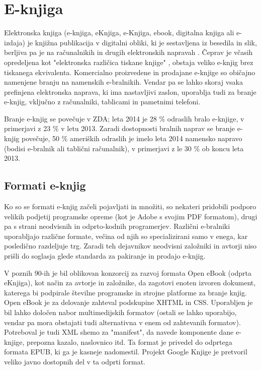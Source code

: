 \documentclass[a4paper, 12pt]{book}
\begin{document}
\section{E-knjiga}
\label{eknjiga}
Elektronska knjiga (e-knjiga, eKnjiga, e-Knjiga, ebook, digitalna knjiga ali e-izdaja) je knjižna publikacija v digitalni obliki, ki je sestavljena iz besedila in slik, berljiva pa je na računalnikih in drugih elektronskih napravah \cite{7}. Čeprav je včasih opredeljena kot "elektronska različica tiskane knjige" \cite{8}, obstaja veliko e-knjig brez tiskanega ekvivalenta. Komercialno proizvedene in prodajane e-knjige so običajno namenjene branju na namenskih e-bralnikih. Vendar pa se lahko skoraj vsaka prefinjena elektronska naprava, ki ima nastavljivi zaslon, uporablja tudi za branje e-knjig, vključno z računalniki, tablicami in pametnimi telefoni.

Branje e-knjig se povečuje v ZDA; leta 2014 je 28 \% odraslih bralo e-knjige, v primerjavi z 23 \% v letu 2013. Zaradi dostopnosti bralnih naprav se branje e-knjig povečuje, 50 \% ameriških odraslih je imelo leta 2014 namensko napravo (bodisi e-bralnik ali tablični računalnik), v primerjavi z le 30 \% ob koncu leta 2013. \cite{9} 

\subsection{Formati e-knjig}
\label{eknjiga_formati}
Ko so se formati e-knjig začeli pojavljati in množiti, so nekateri pridobili podporo velikih podjetij programske opreme (kot je Adobe s svojim PDF formatom), drugi pa s strani neodvisnih in odprto-kodnih programerjev. Različni e-bralniki uporabljajo različne formate, večina od njih so specializirani samo v enega, kar posledično razdeljuje trg. Zaradi teh dejavnikov neodvisni založniki in avtorji niso prišli do soglasja glede standarda za pakiranje in prodajo e-knjig.

V poznih 90-ih je bil oblikovan konzorcij za razvoj formata Open eBook (odprta eKnjiga), kot način za avtorje in založnike, da zagotovi enoten izvoren dokument, katerega bi podpirale številne  programske in strojne platforme za branje knjig. Open eBook je za delovanje zahteval podskupine XHTML in CSS. Uporabljen je bil lahko določen nabor multimedijskih formatov (ostali se lahko uporabijo, vendar pa mora obstajati tudi alternativna v enem od zahtevanih formatov). Potreboval je tudi XML shemo za "manifest", da navede komponente dane e-knjige, prepozna kazalo, naslovnico itd. Ta format je privedel do odprtega formata EPUB, ki ga je kasneje nadomestil. Projekt Google Knjige je pretvoril veliko javno dostopnih del v ta odprti format. \cite{10}
\end{document}
